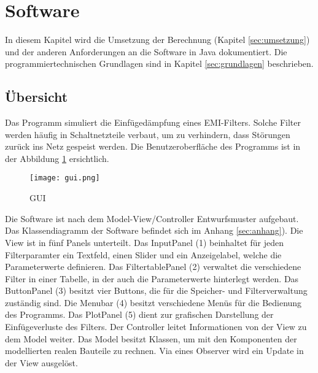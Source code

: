 \section{Software} \label{sec:software}

In diesem Kapitel wird die Umsetzung der Berechnung (Kapitel \ref{sec:umsetzung}) und der anderen Anforderungen an die Software in Java dokumentiert. Die programmiertechnischen Grundlagen sind in Kapitel \ref{sec:grundlagen} beschrieben. 


\subsection{Übersicht} \label{subsec:uebersicht}

Das Programm simuliert die Einfügedämpfung eines EMI-Filters. Solche Filter werden häufig in Schaltnetzteile verbaut, um zu verhindern, dass Störungen zurück ins Netz gespeist werden.  Die Benutzeroberfläche des Programms ist in der Abbildung \ref{fig:GUI} ersichtlich.

\begin{figure}[H]
	\centering
	\texttt{[image: gui.png]}
	\caption{GUI}
	\label{fig:GUI}
\end{figure} 

Die Software ist nach dem Model-View/Controller Entwurfsmuster \cite{MVCDesignPattern} aufgebaut. Das Klassendiagramm der Software befindet sich im Anhang \ref{sec:anhang}).  Die View ist in fünf Panels unterteilt. Das InputPanel (1) beinhaltet für jeden Filterparamter ein Textfeld, einen Slider und ein Anzeigelabel, welche die Parameterwerte definieren. Das  FiltertablePanel (2) verwaltet die verschiedene Filter in einer Tabelle, in der auch die Parameterwerte hinterlegt werden. Das ButtonPanel (3) besitzt vier Buttons, die für die Speicher- und Filterverwaltung zuständig sind. Die Menubar (4) besitzt verschiedene Menüs für die Bedienung des Programms. Das PlotPanel (5) dient zur grafischen Darstellung der Einfügeverluste des Filters. Der Controller leitet Informationen von der View zu dem Model weiter. Das Model besitzt Klassen, um mit den Komponenten der modellierten realen Bauteile zu rechnen. Via eines Observer wird ein Update in der View ausgelöst.

\newpage




